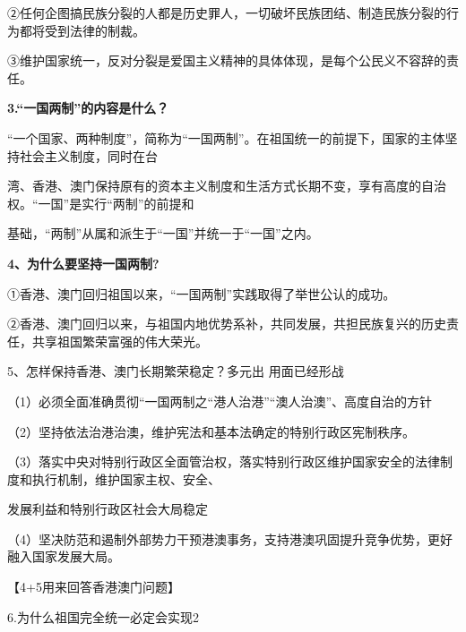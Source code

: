 \documentclass[lang=cn,11pt]{elegantbook}
\newcommand{\daofasym}[1]{{\daofasymbolfont #1}}
\newcommand{\daofasym}[1]{#1}
\begin{document}
\daofasym{②}任何企图搞民族分裂的人都是历史罪人，一切破坏民族团结、制造民族分裂的行为都将受到法律的制裁。\par

\daofasym{③}维护国家统一，反对分裂是爱国主义精神的具体体现，是每个公民义不容辞的责任。\par

\textbf{3.“一国两制”的内容是什么？}\par

“一个国家、两种制度”，简称为“一国两制”。在祖国统一的前提下，国家的主体坚持社会主义制度，同时在台\par

湾、香港、澳门保持原有的资本主义制度和生活方式长期不变，享有高度的自治权。“一国”是实行“两制”的前提和\par

基础，“两制”从属和派生于“一国”并统一于“一国”之内。\par

\textbf{4、为什么要坚持一国两制?}\par

\daofasym{①}香港、澳门回归祖国以来，“一国两制”实践取得了举世公认的成功。\par

\daofasym{②}香港、澳门回归以来，与祖国内地优势系补，共同发展，共担民族复兴的历史责任，共享祖国繁荣富强的伟大荣光。\par

5、怎样保持香港、澳门长期繁荣稳定？多元出 用面已经形战\par

（1）必须全面准确贯彻“一国两制之“港人治港”“澳人治澳”、高度自治的方针\par

（2）坚持依法治港治澳，维护宪法和基本法确定的特别行政区宪制秩序。\par

（3）落实中央对特别行政区全面管治权，落实特别行政区维护国家安全的法律制度和执行机制，维护国家主权、安全、\par

发展利益和特别行政区社会大局稳定\par

（4）坚决防范和遏制外部势力干预港澳事务，支持港澳巩固提升竞争优势，更好融入国家发展大局。\par

【4+5用来回答香港澳门问题】\par

6.为什么祖国完全统一必定会实现2\par
\end{document}
